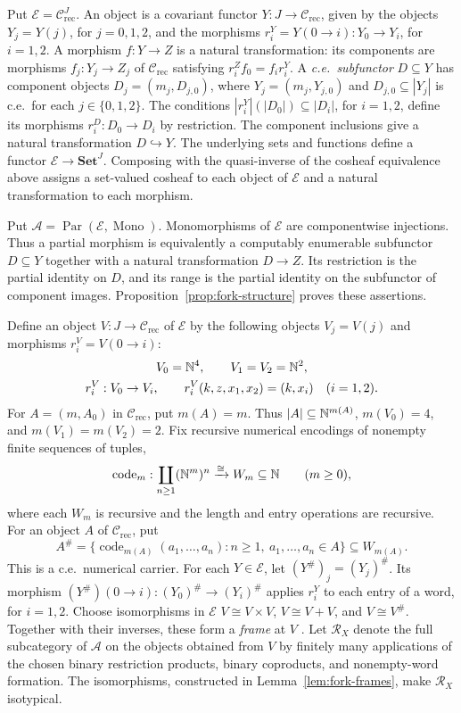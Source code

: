 Put $\mathcal E=\mathcal C_{\mathrm{rec}}^J$.
An object is a covariant functor $Y:J\to\mathcal C_{\mathrm{rec}}$,
given by the objects $Y_j=Y(j)$, for $j=0,1,2$, and the
morphisms $r_i^Y=Y(0\to i):Y_0\to Y_i$, for $i=1,2$.
A morphism $f:Y\to Z$ is a natural transformation: its components
are morphisms $f_j:Y_j\to Z_j$ of $\mathcal C_{\mathrm{rec}}$ satisfying
$r_i^Zf_0=f_i r_i^Y$.
A \emph{c.e.\ subfunctor} $D\subseteq Y$ has component objects
$D_j=(m_j,D_{j,0})$, where $Y_j=(m_j,Y_{j,0})$ and
$D_{j,0}\subseteq|Y_j|$ is c.e.\ for each $j\in\{0,1,2\}$.
The conditions $|r_i^Y|(|D_0|)\subseteq|D_i|$, for $i=1,2$,
define its morphisms $r_i^D:D_0\to D_i$ by restriction.
The component inclusions give a natural transformation $D\hookrightarrow Y$.
The underlying sets and functions define a functor
$\mathcal E\to\mathbf{Set}^J$. Composing with the quasi-inverse of
the cosheaf equivalence above assigns a set-valued cosheaf to each
object of $\mathcal E$ and a natural transformation to each morphism.

Put
$\mathcal A=\operatorname{Par}(\mathcal E,\operatorname{Mono})$.
Monomorphisms of $\mathcal E$ are componentwise injections.
Thus a partial morphism is equivalently a computably enumerable
subfunctor $D\subseteq Y$ together with a natural transformation
$D\to Z$. Its restriction is the partial identity on $D$, and its range is the
partial identity on the subfunctor of component images.
Proposition~\ref{prop:fork-structure} proves these assertions.

Define an object $V:J\to\mathcal C_{\mathrm{rec}}$ of $\mathcal E$
by the following objects $V_j=V(j)$ and morphisms
$r_i^V=V(0\to i)$:
\begin{equation}\label{eq:universal-fork}
 \begin{gathered}
 V_0=\mathbb N^4,\qquad V_1=V_2=\mathbb N^2,\\
 r_i^V:V_0\to V_i,\qquad r_i^V(k,z,x_1,x_2)=(k,x_i)
 \quad(i=1,2).
 \end{gathered}
\end{equation}
For $A=(m,A_0)$ in $\mathcal C_{\mathrm{rec}}$, put
$m(A)=m$. Thus $|A|\subseteq\mathbb N^{m(A)}$,
$m(V_0)=4$, and $m(V_1)=m(V_2)=2$.
Fix recursive numerical encodings of nonempty finite sequences of tuples,
\[
 \operatorname{code}_m:
 \coprod_{n\ge1}(\mathbb N^m)^n\xrightarrow{\cong}W_m\subseteq\mathbb N
 \qquad(m\ge0),
\]
where each $W_m$ is recursive and the length and entry operations
are recursive. For an object $A$ of $\mathcal C_{\mathrm{rec}}$, put
\[
 A^\#=\{\operatorname{code}_{m(A)}(a_1,\ldots,a_n):
                 n\ge1,\ a_1,\ldots,a_n\in A\}\subseteq W_{m(A)}.
\]
This is a c.e.\ numerical carrier. For each $Y\in\mathcal E$, let
$(Y^\#)_j=(Y_j)^\#$. Its morphism
$(Y^\#)(0\to i):(Y_0)^\#\to(Y_i)^\#$ applies $r_i^Y$ to each
entry of a word, for $i=1,2$.
Choose isomorphisms in $\mathcal E$
$V\cong V\times V$, $V\cong V+V$, and $V\cong V^\#$.
Together with their inverses, these form a \emph{frame} at $V$
\cite[Section 3]{Heller}.
Let $\mathscr R_X$ denote the full subcategory of $\mathcal A$
on the objects obtained from $V$ by finitely many applications of
the chosen binary restriction products, binary coproducts, and
nonempty-word formation.
The isomorphisms, constructed in Lemma~\ref{lem:fork-frames}, make
$\mathscr R_X$ isotypical.

